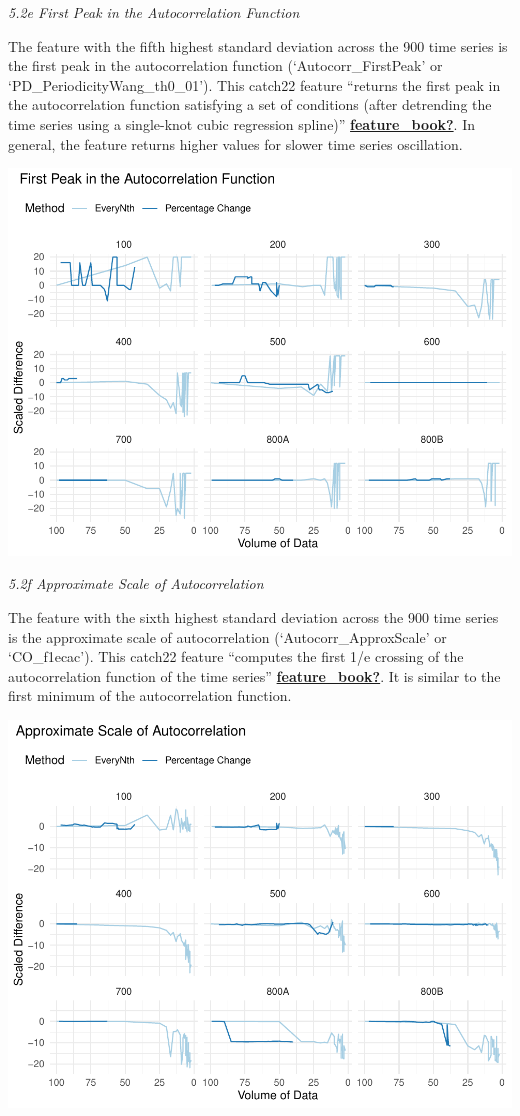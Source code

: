 \documentclass{article}
\begin{document}
\emph{5.2e First Peak in the Autocorrelation Function}

The feature with the fifth highest standard deviation across the 900
time series is the first peak in the autocorrelation function
(`Autocorr\_FirstPeak' or `PD\_PeriodicityWang\_th0\_01'). This catch22
feature ``returns the first peak in the autocorrelation function
satisfying a set of conditions (after detrending the time series using a
single-knot cubic regression spline)''
\protect\hyperlink{ref-feature_book}{\textbf{feature\_book?}}. In
general, the feature returns higher values for slower time series
oscillation.

\includegraphics{210431461_CSC8639_Dissertation_files/figure-latex/FirstPeak-1.pdf}

\emph{5.2f Approximate Scale of Autocorrelation}

The feature with the sixth highest standard deviation across the 900
time series is the approximate scale of autocorrelation
(`Autocorr\_ApproxScale' or `CO\_f1ecac'). This catch22 feature
``computes the first 1/e crossing of the autocorrelation function of the
time series''
\protect\hyperlink{ref-feature_book}{\textbf{feature\_book?}}. It is
similar to the first minimum of the autocorrelation function.

\includegraphics{210431461_CSC8639_Dissertation_files/figure-latex/ApproxScale-1.pdf}
\end{document}
